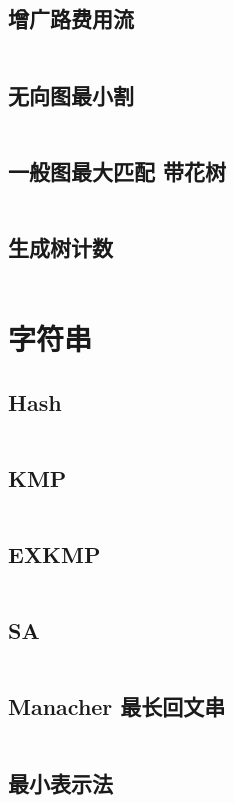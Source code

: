 \documentclass[titlepage,landscape,a4paper,10pt]{article}
\begin{document}
\begin{multicols}{2}
\begin{spacing}{0.8}
\subsection{增广路费用流}
\inputminted{cpp}{Graph/增广路费用流.cpp}

\subsection{无向图最小割}
\inputminted{cpp}{Graph/无向图最小割.cpp}

\subsection{一般图最大匹配 带花树}
\inputminted{cpp}{Graph/带花树.cpp}

\subsection{生成树计数}
\inputminted{cpp}{Graph/生成树计数.cpp}

\section{字符串}

\subsection{Hash}
\inputminted{cpp}{Strings/BKDRHash.cpp}

\subsection{KMP}
\inputminted{cpp}{Strings/KMP.cpp}

\subsection{EXKMP}
\inputminted{cpp}{Strings/EXKMP.cpp}

\subsection{SA}
\inputminted{cpp}{Strings/SA.cpp}

\subsection{Manacher 最长回文串}
\inputminted{cpp}{Strings/Manacher.cpp}

\subsection{最小表示法}
\inputminted{cpp}{Strings/最小表示法.cpp}


\end{spacing}
\end{multicols}
\end{document}

